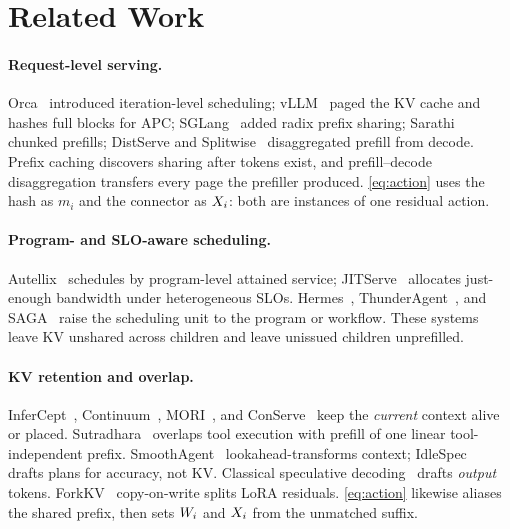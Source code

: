 \section{Related Work}
\label{sec:related}

\paragraph{Request-level serving.}
Orca~\cite{orca} introduced iteration-level scheduling; vLLM~\cite{vllm} paged the KV cache and hashes full blocks for APC; SGLang~\cite{sglang} added radix prefix sharing; Sarathi~\cite{sarathi,sarathisplit} chunked prefills; DistServe and Splitwise~\cite{distserve,splitwise} disaggregated prefill from decode.
Prefix caching discovers sharing after tokens exist, and prefill--decode disaggregation transfers every page the prefiller produced.
\eqref{eq:action} uses the hash as $m_i$ and the connector as $X_i$: both are instances of one residual action.

\paragraph{Program- and SLO-aware scheduling.}
Autellix~\cite{autellix} schedules by program-level attained service; JITServe~\cite{jitserve} allocates just-enough bandwidth under heterogeneous SLOs.
Hermes~\cite{hermes}, ThunderAgent~\cite{thunderagent}, and SAGA~\cite{saga} raise the scheduling unit to the program or workflow.
These systems leave KV unshared across children and leave unissued children unprefilled.

\paragraph{KV retention and overlap.}
InferCept~\cite{infercept}, Continuum~\cite{continuum}, MORI~\cite{mori}, and ConServe~\cite{conserve} keep the \emph{current} context alive or placed.
Sutradhara~\cite{sutradhara} overlaps tool execution with prefill of one linear tool-independent prefix.
SmoothAgent~\cite{smoothagent} lookahead-transforms context; IdleSpec~\cite{idlespec} drafts plans for accuracy, not KV.
Classical speculative decoding~\cite{speculative,medusa,eagledraft} drafts \emph{output} tokens.
ForkKV~\cite{forkkv} copy-on-write splits LoRA residuals.
\eqref{eq:action} likewise aliases the shared prefix, then sets $W_i$ and $X_i$ from the unmatched suffix.


